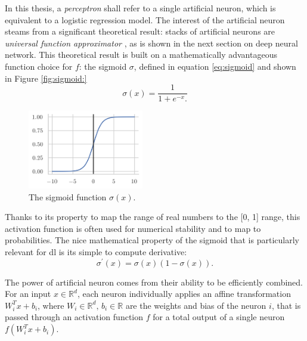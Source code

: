 In this thesis, a \textit{perceptron} shall refer to a single artificial neuron, which is equivalent to a logistic regression model. The interest of the artificial neuron steams from a significant theoretical result: stacks of artificial neurons are \textit{universal function approximator} \cite{universalFuncApproxNN,HORNIK1989359}, as is shown in the next section on deep neural network. This theoretical result is built on a mathematically advantageous function choice for $f$: the sigmoid $\sigma$, defined in equation \ref{eq:sigmoid} and shown in Figure \ref{fig:sigmoid:}
\begin{equation}\label{eq:sigmoid}
    \sigma(x) = \frac{1}{1 + e^{-x}.}
\end{equation}

\begin{figure}
    \begin{center}
        \includegraphics[width=0.45\textwidth]{Images/ML/sigmoid.png}
        \caption{The sigmoid function $\sigma(x)$.} 
        \label{fig:sigmoid}
    \end{center}
\end{figure}

Thanks to its property to map the range of real numbers to the [0, 1] range, this activation function is often used for numerical stability and to map to probabilities. The nice mathematical property of the sigmoid that is particularly relevant for \gls{dl} is its simple to compute derivative: \[\sigma^\prime(x) = \sigma(x) (1- \sigma(x)).\]

The power of artificial neuron comes from their ability to be efficiently combined. For an input $x \in \mathbb{R}^d$, each neuron individually applies an affine transformation $W_i^T x + b_i$, where $W_i \in \mathbb{R}^d,\,b_i \in \mathbb{R}$ are the weights and bias of the neuron $i$, that is passed through an activation function $f$ for a total output of a single neuron $f(W_i^T x + b_i)$.

